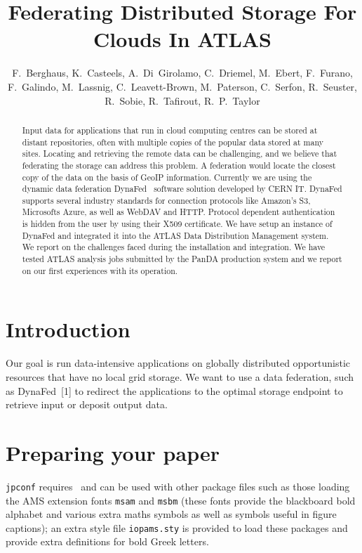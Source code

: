\documentclass[a4paper]{jpconf}
\begin{document}
\title{Federating Distributed Storage For Clouds In ATLAS}

\author{F.~Berghaus, K.~Casteels, A.~Di~Girolamo, C.~Driemel, M.~Ebert, F.~Furano, F.~Galindo, M.~Lassnig, C.~Leavett-Brown, M.~Paterson, C.~Serfon, R.~Seuster, R.~Sobie, R.~Tafirout, R.~P.~Taylor}

\address{Frank~Berghaus, G07810, CERN, CH-1211 Geneva 23,  Switzerland}


\begin{abstract}
Input data for applications that run in cloud computing centres can be stored at distant repositories, often with multiple copies of the popular data stored at many sites. Locating and retrieving the remote data can be challenging, and we believe that federating the storage can address this problem. A federation would locate the closest copy of the data on the basis of GeoIP information. Currently we are using the dynamic data federation DynaFed~\cite{dynafed} software solution developed by CERN IT. DynaFed supports several industry standards for connection protocols like Amazon's S3, Microsofts Azure, as well as WebDAV and HTTP. Protocol dependent authentication is hidden from the user by using their X509 certificate. We have setup an instance of DynaFed and integrated it into the ATLAS Data Distribution Management system. We report on the challenges faced during the installation and integration. We have tested ATLAS analysis jobs submitted by the PanDA production system and we report on our first experiences with its operation.
\end{abstract}

\section{Introduction}
Our goal is run data-intensive applications on globally distributed opportunistic resources that have no local grid storage. We want to use a data federation, such as DynaFed [1] to redirect the applications to the optimal storage endpoint to retrieve input or deposit output data.

\section{Preparing your paper}
\verb"jpconf" requires \LaTeXe\ and  can be used with other package files such
as those loading the AMS extension fonts
\verb"msam" and \verb"msbm" (these fonts provide the
blackboard bold alphabet and various extra maths symbols as well as
symbols useful in figure captions); an extra style file \verb"iopams.sty" is
provided to load these packages and provide extra definitions for bold Greek letters.
\end{document}
